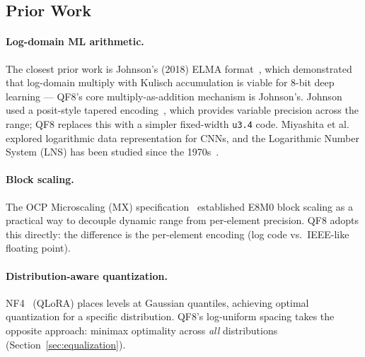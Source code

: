 \documentclass[11pt,letterpaper]{article}
\theoremstyle{definition}
\theoremstyle{remark}
\begin{document}
\subsection{Prior Work}

\paragraph{Log-domain ML arithmetic.}
The closest prior work is Johnson's (2018) ELMA format~\cite{johnson2018}, which demonstrated
that log-domain multiply with Kulisch accumulation is viable for 8-bit deep
learning --- QF8's core multiply-as-addition mechanism is Johnson's.
Johnson used a posit-style tapered encoding~\cite{gustafson2017}, which provides variable
precision across the range; QF8 replaces this with a simpler fixed-width
\texttt{u3.4} code.
Miyashita et al.~\cite{miyashita2016} explored logarithmic data representation for CNNs,
and the Logarithmic Number System (LNS) has been studied since the
1970s~\cite{kingsbury1971, swartzlander1975}.

\paragraph{Block scaling.}
The OCP Microscaling (MX) specification~\cite{rouhani2023} established E8M0 block scaling as a
practical way to decouple dynamic range from per-element precision.
QF8 adopts this directly: the difference is the per-element encoding
(log code vs.\ IEEE-like floating point).

\paragraph{Distribution-aware quantization.}
NF4~\cite{dettmers2023} (QLoRA) places levels at Gaussian quantiles, achieving optimal
quantization for a specific distribution.
QF8's log-uniform spacing takes the opposite approach: minimax optimality
across \emph{all} distributions (Section~\ref{sec:equalization}).
\end{document}
